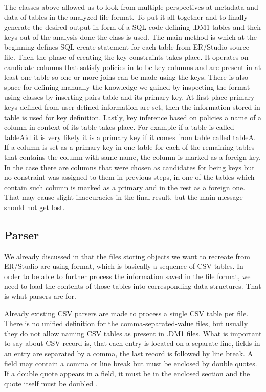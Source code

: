 The classes above allowed us to look from multiple perspectives at metadata and data of tables in the analyzed file format.
To put it all together and to finally generate the desired output in form of a SQL code defining .DM1 tables and their keys out of the analysis done the class  is used.
The main method is  which at the beginning defines SQL create statement for each table from ER/Studio source file. 
Then the phase of creating the key constraints takes place. It operates on candidate columns that satisfy policies in  to be key columns and are present in at least one table so one or more joins can be made using the keys.
There is also space for defining manually the knowledge we gained by inspecting the format using  classes by inserting pairs table and its primary key.
At first place primary keys defined from user-defined information are set, then the information stored in  table is used for key definition. Lastly, key inference based on policies a name of a column in context of its table takes place. For example if a table is called tableA\textunderscore id it is very likely it is a primary key if it comes from table called tableA.
If a column is set as a primary key in one table for each of the remaining tables that contains the column with same name, the column is marked as a foreign key.
In the case there are columns that were chosen as candidates for being keys but no constraint was assigned to them in previous steps, in one of the tables which contain such column is marked as a primary and in the rest as a foreign one. That may cause slight inaccuracies in the final result, but the main message should not get lost.

\subsection{Parser}
\label{subsec:dm1_parser}

We already discussed in  that the files storing objects we want to recreate from ER/Studio are using format, which is basically a sequence of CSV tables. In order to be able to further process the information saved in the file format, we need to load the contents of those tables into corresponding data structures. That is what parsers are for.

Already existing CSV parsers are made to process a single CSV table per file. There is no unified definition for the comma-separated-value files, but usually they do not allow naming CSV tables as present in .DM1 files.
What is important to say about CSV record is, that each entry is located on a separate line, fields in an entry are separated by a comma, the last record is followed by line break. A field may contain a comma or line break but must be enclosed by double quotes.
If a double quote appears in a field, it must be in the enclosed section and the quote itself must be doubled \cite{RfcCSV}.

